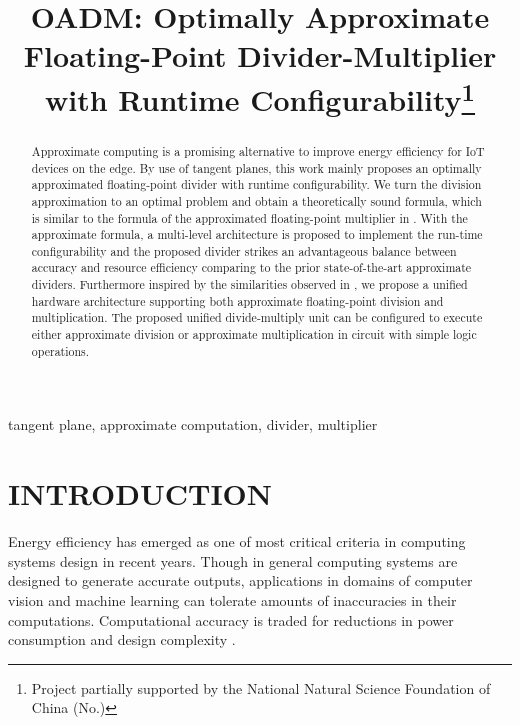 \documentclass[conference]{IEEEtran}
\begin{document}
\title{OADM: Optimally Approximate Floating-Point Divider-Multiplier with Runtime Configurability\footnote{Project partially supported by the National Natural Science Foundation of China (No.)}}
\maketitle

\begin{abstract}
Approximate computing is a promising alternative to improve energy efficiency for IoT devices on the edge. By use of tangent planes, this work mainly proposes an optimally approximated floating-point divider with runtime configurability. We turn the division approximation to an optimal problem and obtain a theoretically sound formula, which is similar to the formula of the approximated floating-point multiplier in \cite{CTChen}. With the approximate formula, a multi-level architecture is proposed to implement the run-time configurability and the proposed divider strikes an advantageous balance between accuracy and resource efficiency comparing to the prior state-of-the-art approximate dividers. Furthermore inspired by the similarities observed in \cite{CTChen}, we propose a unified hardware architecture supporting both approximate floating-point division and multiplication. The proposed unified divide-multiply unit can be configured to execute either approximate division or approximate multiplication in circuit with simple logic operations.
\end{abstract}

\begin{IEEEkeywords}
tangent plane, approximate computation, divider, multiplier
\end{IEEEkeywords}

\section{INTRODUCTION}
\label{Intro1}
Energy efficiency has emerged as one of most critical criteria in computing systems design in recent years.
Though in general computing systems are designed to generate accurate outputs,  applications in domains of computer vision and machine learning can tolerate amounts of inaccuracies in their computations. Computational accuracy is traded for reductions in power consumption and design complexity \cite{JHan} \cite{VGupta2011}.
\end{document}

